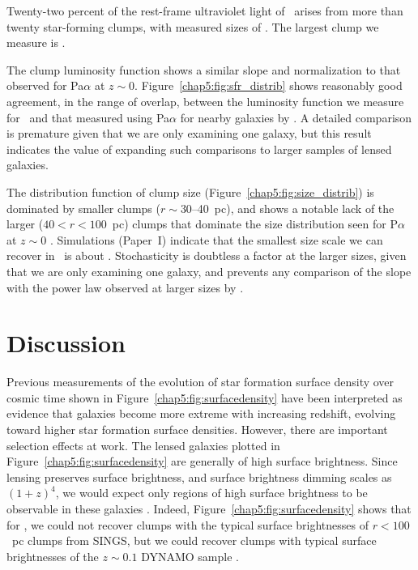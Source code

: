 Twenty-two percent of the rest-frame ultraviolet light of \arcname\ arises from 
more than twenty star-forming clumps, with measured sizes of  \rangeofscales. 
The largest clump we measure is \largestclump.  

The clump luminosity function shows a similar slope 
and normalization to that observed for Pa$\alpha$ at $z\sim0$.  
Figure~\ref{chap5:fig:sfr_distrib} shows reasonably good agreement, 
in the range of overlap, 
between the luminosity function we measure for \arcname\ and that measured
using Pa$\alpha$ for nearby galaxies by \citet{Liu:2013qy}.  A detailed comparison is
premature given that we are only examining one galaxy, but this result
indicates the value of expanding such comparisons to larger samples of lensed galaxies.

 The distribution function of clump size (Figure~\ref{chap5:fig:size_distrib})
is dominated by smaller clumps 
($r\sim 30$--40~pc), and shows a notable lack of the larger ($40<r<100$~pc) clumps 
that dominate the size distribution seen for P$\alpha$ at 
$z\sim0$ \citep{Liu:2013qy}.  
Simulations (Paper~I) indicate that the smallest size scale we can recover in \arcname\ is 
about \smallestscale.
Stochasticity is doubtless a factor at the larger sizes, given that we are only examining one galaxy,
and prevents any comparison of the slope with the power law observed at larger sizes
by \citet{Liu:2013qy}.
 
\section{Discussion}
Previous measurements \citep{Livermore:2012fk, Livermore:2015ve}   
of the evolution of star formation surface density  over cosmic time
shown in Figure~\ref{chap5:fig:surfacedensity} 
have been interpreted as evidence that galaxies
become more extreme with increasing redshift, evolving toward 
higher star formation surface densities.  However, there are important selection effects at work.
The lensed galaxies plotted in Figure~\ref{chap5:fig:surfacedensity} are generally of high surface brightness.
Since lensing preserves surface brightness, and surface brightness dimming scales as $(1+z)^4$, 
we would expect only regions of high surface brightness to be observable in these galaxies \citep{Calvi:2014bm}.
Indeed,  Figure~\ref{chap5:fig:surfacedensity} shows that for \arcname, 
we could not recover clumps with the typical surface brightnesses of 
$r<100$~pc clumps from SINGS, but we could
recover clumps with typical surface brightnesses of the $z\sim 0.1$ DYNAMO 
sample \citep{Fisher:2017tk}.

